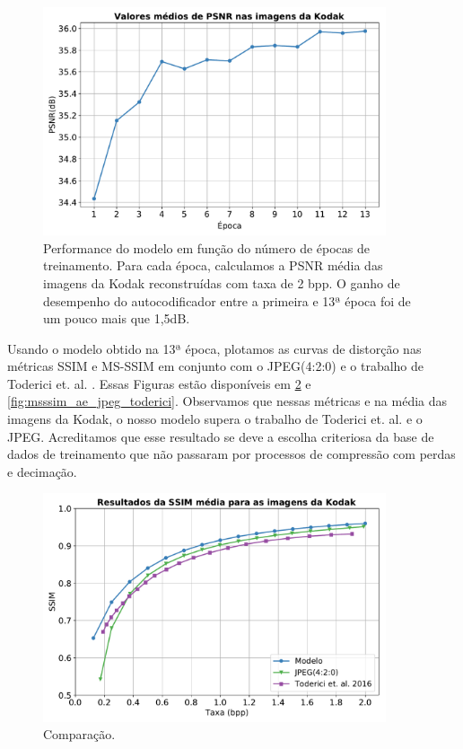 \begin{figure}
	\centering
	\includegraphics[width=0.9\textwidth]{figuras/psnr_13epochs.pdf}
	\caption[Performance do modelo em função do número de épocas de treinamento]{Performance do modelo em função do número de épocas de treinamento. Para cada época, calculamos a PSNR média das imagens da Kodak reconstruídas com taxa de 2 bpp.  O ganho de desempenho do autocodificador entre a primeira e 13ª época foi de um pouco mais que 1,5dB.}
	\label{fig:psnr_13epocas}
\end{figure}		

Usando o modelo obtido na 13ª época, plotamos as curvas de distorção nas métricas SSIM e MS-SSIM em conjunto com o JPEG(4:2:0) e o trabalho de Toderici et. al. \cite{FullResolution2017Toderici}. Essas Figuras estão disponíveis em \ref{fig:ssim_ae_jpeg_toderici} e   \ref{fig:msssim_ae_jpeg_toderici}. 
Observamos que nessas métricas e na média das imagens da Kodak, o nosso modelo supera o trabalho de Toderici et. al. e o JPEG. Acreditamos que esse resultado se deve a escolha criteriosa da base de dados de treinamento que não passaram por processos de compressão com perdas e decimação.

\begin{figure}
	\centering
	\includegraphics[width=0.9\textwidth]{figuras/ssim_ae_jpeg_toderici.pdf}
	\caption{Comparação.}
	\label{fig:ssim_ae_jpeg_toderici}
\end{figure}	



